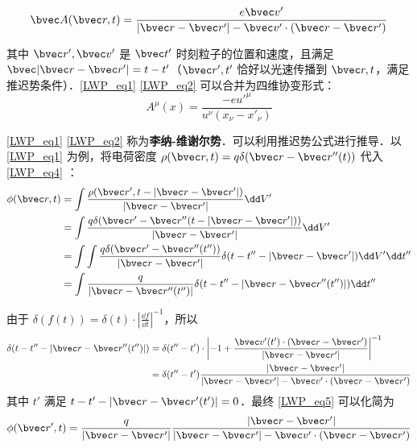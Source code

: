 \begin{equation}\label{LWP_eq2}
\bvec A(\bvec r,t)=\frac{e\bvec v'}{|\bvec r-\bvec r'|-\bvec v'\cdot (\bvec r-\bvec r')}
\end{equation}

其中 $\bvec r',\bvec v'$ 是 $\bvec t'$ 时刻粒子的位置和速度，且满足 $\bvec |\bvec r-\bvec r'|=t-t'$（$\bvec r',t'$ 恰好以光速传播到 $\bvec r,t$，满足推迟势条件）．\autoref{LWP_eq1} \autoref{LWP_eq2} 可以合并为四维协变形式：
\begin{equation}
A^\mu(x)=\frac{-e u'^\mu}{u^\nu (x_\nu-x'_\nu)}
\end{equation}

\autoref{LWP_eq1} \autoref{LWP_eq2} 称为\textbf{李纳-维谢尔势}．可以利用推迟势公式进行推导．以\autoref{LWP_eq1} 为例，将电荷密度 $\rho(\bvec r,t)=q\delta(\bvec r-\bvec r''(t))$ 代入 
\autoref{LWP_eq4} ：
\begin{equation}\label{LWP_eq5}
\begin{aligned}
\phi(\bvec r,t)&=\int \frac{\rho(\bvec r',t-|\bvec r-\bvec r'|)}{|\bvec r-\bvec r'|}\dd V'\\
&=\int \frac{q\delta(\bvec r'-\bvec r''(t-|\bvec r-\bvec r'|))}{|\bvec r-\bvec r'|}\dd V'\\
&=\int \int \frac{q\delta(\bvec r'-\bvec r''(t''))}{|\bvec r-\bvec r'|}\delta (t-t''-|\bvec r-\bvec r'|)\dd V'\dd t''\\
&=\int \frac{q}{|\bvec r-\bvec r''(t'')|}\delta (t-t''-|\bvec r-\bvec r''(t'')|)\dd t''
\end{aligned}\\
\end{equation}

由于 $\delta(f(t))=\delta(t)\cdot \left|\frac{\dd f}{\dd t}\right|^{-1}$，所以
\begin{equation}
\begin{aligned}
\delta (t-t''-|\bvec r-\bvec r''(t'')|)&=\delta(t''-t')\cdot \left|-1+\frac{\bvec v'(t')\cdot (\bvec r-\bvec r')}{|\bvec r-\bvec r'|}\right|^{-1}\\
&=\delta(t''-t')\frac{|\bvec r-\bvec r'|}{|\bvec r-\bvec r'|-\bvec v'\cdot (\bvec r-\bvec r')}
\end{aligned}
\end{equation}
其中 $t'$ 满足 $t-t'-|\bvec r-\bvec r'(t')|=0$．最终 \autoref{LWP_eq5} 可以化简为
\begin{equation}
\phi(\bvec r',t)=\frac{q}{|\bvec r-\bvec r'|}\frac{|\bvec r-\bvec r'|}{|\bvec r-\bvec r'|-\bvec v'\cdot (\bvec r-\bvec r')}
\end{equation}